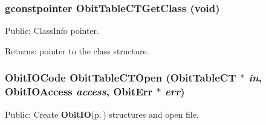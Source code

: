 \subsubsection{\setlength{\rightskip}{0pt plus 5cm}gconstpointer Obit\-Table\-CTGet\-Class (void)}\label{ObitTableCT_8h_a13}


Public: Class\-Info pointer. 

\begin{Desc}
\item[Returns:]pointer to the class structure. \end{Desc}
\subsubsection{\setlength{\rightskip}{0pt plus 5cm}Obit\-IOCode Obit\-Table\-CTOpen ({\bf Obit\-Table\-CT} $\ast$ {\em in}, Obit\-IOAccess {\em access}, {\bf Obit\-Err} $\ast$ {\em err})}\label{ObitTableCT_8h_a17}


Public: Create {\bf Obit\-IO}{\rm (p.\,\pageref{structObitIO})} structures and open file. 

